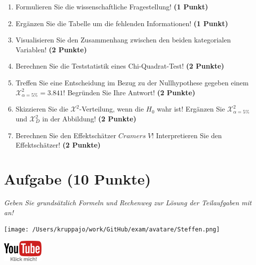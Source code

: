 \documentclass[a4paper, 9pt]{scrartcl}\usepackage[]{graphicx}\usepackage[]{xcolor}
\begin{document}
\begin{enumerate}
\item Formulieren Sie die wissenschaftliche Fragestellung! \textbf{(1 Punkt)}
\item Ergänzen Sie die Tabelle um die fehlenden Informationen! \textbf{(1 Punkt)} 
\item Visualisieren Sie den Zusammenhang zwischen den beiden kategorialen Variablen! \textbf{(2 Punkte)}
\item Berechnen Sie die Teststatistik eines Chi-Quadrat-Test! \textbf{(2 Punkte)}
\item Treffen Sie eine Entscheidung im Bezug zu der Nullhypothese gegeben
  einem $\mathcal{X}^2_{\alpha = 5\%} = 3.841$! Begründen Sie Ihre Antwort!
  \textbf{(2 Punkte)}
\item Skizzieren Sie die $\mathcal{X}^2$-Verteilung, wenn die $H_0$ wahr ist! Ergänzen Sie  $\mathcal{X}^2_{\alpha = 5\%}$ und $\mathcal{X}^2_{D}$ in der Abbildung! \textbf{(2 Punkte)}
\item Berechnen Sie den Effektschätzer $Cramers\; V$! Interpretieren Sie den
  Effektschätzer! \textbf{(2 Punkte)}
\end{enumerate} 
\clearpage

\section{Aufgabe \hfill (10 Punkte)}

\textit{Geben Sie grundsätzlich Formeln und Rechenweg zur Lösung der Teilaufgaben mit an!} \\[1Ex]
 

 
\begin{minipage}[t]{0.5\textwidth}
\texttt{[image: /Users/kruppajo/work/GitHub/exam/avatare/Steffen.png]}
\end{minipage}
\begin{minipage}[t]{0.5\textwidth}
\hfill
\href{https://youtu.be/jakM7fHyZfU}{\includegraphics[width = 2cm]{img/youtube}}
\end{minipage}
\vspace{-3Ex}
\end{document}

